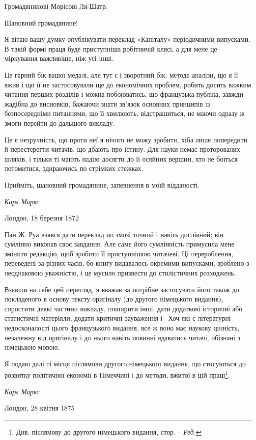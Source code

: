 

\begin{center}
Громадянинові Морісові Ля-Шатр.
\end{center}

Шановний громадянине!

Я вітаю вашу думку опублікувати переклад «Капіталу» періодичними
випусками. В такій формі праця буде приступніша
робітничій клясі, а для мене це міркування важливіше, ніж
усі інші.

Це гарний бік вашої медалі, але тут є і зворотний бік: метода
аналізи, що я її вжив і що її не застосовували ще до економічних
проблем, робить досить важким читання перших розділів і можна
побоюватись, що французька публіка, завжди жадібна до висновків,
бажаючи знати зв’язок основних принципів із безпосередніми
питаннями, що її хвилюють, відстрашиться, не маючи одразу ж
змоги перейти до дальшого викладу.

Це є незручність, що проти неї я нічого не можу зробити, хіба
лише попередити й перестерегти читачів, що дбають про істину.
Для науки немає проторованих шляхів, і тільки ті мають надію
досягти до її осяйних вершин, хто не боїться потомитися, здираючись
по стрімких стежках.

Прийміть, шановний громадянине, запевнення в моїй відданості.

\begin{flushright}
\emph{Карл Маркс}
\end{flushright}

{\small Лондон, 18 березня 1872}


Пан Ж. Руа взявся дати переклад по змозі точний і навіть
дослівний; він сумлінно виконав своє завдання. Але саме його
сумлінність примусила мене змінити редакцію, щоб зробити її
приступнішою читачеві. Ці перероблення, переведені за різних
часів, бо книгу видавалось окремими випусками, зроблено з
неоднаковою уважністю, і це мусило призвести до стилістичних
розходжень.

Взявши на себе цей перегляд, я вважав за потрібне застосувати
його також до покладеного в основу тексту ориґіналу (до другого
німецького видання), спростити деякі частини викладу, поширити
інші, дати додаткові історичні або статистичні матеріяли, додати
критичні зауваження і~ Хоч які є літературні недосконалості
цього французького видання, все ж воно має наукову цінність,
незалежну від оригіналу і до нього навіть повинні вдаватись
читачі, обізнані з німецькою мовою.

Я подаю далі ті місця післямови другого німецького видання,
що стосуються до розвитку політичної економії в Німеччині і до
методи, вжитої в цій праці\footnote*{
Див. післямову до другого німецького видання, стор. \pageref{original-81}--\pageref{original-88} \emph{Ред.}
}.

\begin{flushright}
\emph{Карл Маркс}
\end{flushright}

{\small Лондон, 28 квітня 1875~}
